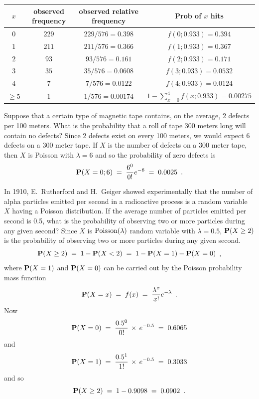 \begin{ExerciseList}
\begin{center}
{\small
\begin{tabular}{|c|c|c|c|}
\hline
$x$ & observed frequency & observed relative frequency & Prob of $x$ hits\\\hline
$0$ & $229$ & $229/576=0.398$ & $f(0;0.933) = 0.394$\\
$1$ & $211$ & $211/576=0.366$ & $f(1;0.933) = 0.367$\\
$2$ & $93$ & $93/576=0.161$ & $f(2;0.933) = 0.171$\\
$3$ & $35$ & $35/576=0.0608$ & $f(3;0.933) = 0.0532$\\
$4$ & $7$ & $7/576=0.0122$ & $f(4;0.933) = 0.0124$\\
$\geq 5$ & $1$ & $1/576=0.00174$ & $1-\sum_{x=0}^4f(x;0.933) = 0.00275$\\\hline
\end{tabular}
}
\end{center}

\Exercise 
Suppose that a certain type of magnetic tape contains, on the average, 2 defects per 100 meters.  
What is the probability that a roll of tape 300 meters long will contain  no defects?
\Answer
Since 2 defects exist on every 100 meters, we would expect 6 defects on a 300 meter tape.  
If $X$ is the number of defects on a 300 meter tape, then $X$ is Poisson with $\lambda = 6$ and so the probability of zero defects is
$$\mathbf{P}(X=0;6)\;=\;\frac{6^0}{0!}e^{-6}\;=\;0.0025\enspace.$$

\Exercise
In 1910, E.~Rutherford and H.~Geiger showed experimentally that the number of alpha particles emitted per second in a radioactive process is a random variable $X$ having a Poisson distribution. If the average number of particles emitted per second is  0.5, what is the probability of observing two or more particles during any given second?
\Answer
Since $X$ is $\mbox{{\rm Poisson}}(\lambda)$ random variable with $\lambda=0.5$, $\mathbf{P}(X\geq2)$ 
is the probability of observing two or more particles during any
given second. $$\mathbf{P}(X\geq 2)\;=\;1-\mathbf{P}(X<2)\;=\;1-\mathbf{P}(X=1)-\mathbf{P}(X=0)\enspace,$$
where $\mathbf{P}(X=1)$ and $\mathbf{P}(X=0)$ can be carried out by the Poisson
probability mass function $$\mathbf{P}(X=x)\;=\; f(x)\;=\;\frac{\lambda^x}{x!}e^{-\lambda}\enspace.$$
Now \[\mathbf{P}(X=0)\;=\;\frac{0.5^0}{0!}\,\times \,e^{-0.5} \;=\; 0.6065\] and
\[ \mathbf{P}(X=1)\;=\;\frac{0.5^1}{1!}\,\times \, e^{-0.5}\;=\; 0.3033\] and so
$$\mathbf{P}(X\geq 2)\;=\; 1- 0.9098\;= \;0.0902\enspace.$$


\end{ExerciseList}
